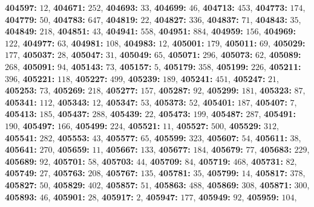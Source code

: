 \textsf{\bfseries 404597:} $12$, \textsf{\bfseries 404671:} $252$, \textsf{\bfseries 404693:} $33$, \textsf{\bfseries 404699:} $46$, \textsf{\bfseries 404713:} $453$, \textsf{\bfseries 404773:} $174$, \textsf{\bfseries 404779:} $50$, \textsf{\bfseries 404783:} $647$, \textsf{\bfseries 404819:} $22$, \textsf{\bfseries 404827:} $336$, \textsf{\bfseries 404837:} $71$, \textsf{\bfseries 404843:} $35$, \textsf{\bfseries 404849:} $218$, \textsf{\bfseries 404851:} $43$, \textsf{\bfseries 404941:} $558$, \textsf{\bfseries 404951:} $884$, \textsf{\bfseries 404959:} $156$, \textsf{\bfseries 404969:} $122$, \textsf{\bfseries 404977:} $63$, \textsf{\bfseries 404981:} $108$, \textsf{\bfseries 404983:} $12$, \textsf{\bfseries 405001:} $179$, \textsf{\bfseries 405011:} $69$, \textsf{\bfseries 405029:} $177$, \textsf{\bfseries 405037:} $28$, \textsf{\bfseries 405047:} $31$, \textsf{\bfseries 405049:} $65$, \textsf{\bfseries 405071:} $296$, \textsf{\bfseries 405073:} $62$, \textsf{\bfseries 405089:} $268$, \textsf{\bfseries 405091:} $94$, \textsf{\bfseries 405143:} $73$, \textsf{\bfseries 405157:} $5$, \textsf{\bfseries 405179:} $358$, \textsf{\bfseries 405199:} $226$, \textsf{\bfseries 405211:} $396$, \textsf{\bfseries 405221:} $118$, \textsf{\bfseries 405227:} $499$, \textsf{\bfseries 405239:} $189$, \textsf{\bfseries 405241:} $451$, \textsf{\bfseries 405247:} $21$, \textsf{\bfseries 405253:} $73$, \textsf{\bfseries 405269:} $218$, \textsf{\bfseries 405277:} $157$, \textsf{\bfseries 405287:} $92$, \textsf{\bfseries 405299:} $181$, \textsf{\bfseries 405323:} $87$, \textsf{\bfseries 405341:} $112$, \textsf{\bfseries 405343:} $12$, \textsf{\bfseries 405347:} $53$, \textsf{\bfseries 405373:} $52$, \textsf{\bfseries 405401:} $187$, \textsf{\bfseries 405407:} $7$, \textsf{\bfseries 405413:} $185$, \textsf{\bfseries 405437:} $288$, \textsf{\bfseries 405439:} $22$, \textsf{\bfseries 405473:} $199$, \textsf{\bfseries 405487:} $287$, \textsf{\bfseries 405491:} $190$, \textsf{\bfseries 405497:} $166$, \textsf{\bfseries 405499:} $224$, \textsf{\bfseries 405521:} $11$, \textsf{\bfseries 405527:} $500$, \textsf{\bfseries 405529:} $312$, \textsf{\bfseries 405541:} $282$, \textsf{\bfseries 405553:} $43$, \textsf{\bfseries 405577:} $65$, \textsf{\bfseries 405599:} $323$, \textsf{\bfseries 405607:} $54$, \textsf{\bfseries 405611:} $38$, \textsf{\bfseries 405641:} $270$, \textsf{\bfseries 405659:} $11$, \textsf{\bfseries 405667:} $133$, \textsf{\bfseries 405677:} $184$, \textsf{\bfseries 405679:} $77$, \textsf{\bfseries 405683:} $229$, \textsf{\bfseries 405689:} $92$, \textsf{\bfseries 405701:} $58$, \textsf{\bfseries 405703:} $44$, \textsf{\bfseries 405709:} $84$, \textsf{\bfseries 405719:} $468$, \textsf{\bfseries 405731:} $82$, \textsf{\bfseries 405749:} $27$, \textsf{\bfseries 405763:} $208$, \textsf{\bfseries 405767:} $135$, \textsf{\bfseries 405781:} $35$, \textsf{\bfseries 405799:} $14$, \textsf{\bfseries 405817:} $378$, \textsf{\bfseries 405827:} $50$, \textsf{\bfseries 405829:} $402$, \textsf{\bfseries 405857:} $51$, \textsf{\bfseries 405863:} $488$, \textsf{\bfseries 405869:} $308$, \textsf{\bfseries 405871:} $300$, \textsf{\bfseries 405893:} $46$, \textsf{\bfseries 405901:} $28$, \textsf{\bfseries 405917:} $2$, \textsf{\bfseries 405947:} $177$, \textsf{\bfseries 405949:} $92$, \textsf{\bfseries 405959:} $104$, 
